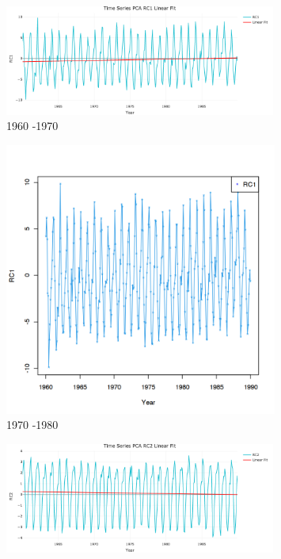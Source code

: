 \documentclass[12pt,a4paper]{article}
\begin{document}
\begin{figure}[t!ph]
         \begin{subfigure}[b]{0.3\textwidth}
                 \centering
                 \includegraphics[width=0.98\textwidth]{./gaphics/q002_d.png}
                 \caption{1960 -1970}
                 \label{fig2:coolcat}
         \end{subfigure}
         \begin{subfigure}[b]{0.3\textwidth}
                 \centering
                 \includegraphics[width=0.985\textwidth]{./gaphics/q002_e.png}
               \caption{1970 -1980}
                 \label{fig2:bossycat}
         \end{subfigure}%
         \begin{subfigure}[b]{0.3\textwidth}
                 \centering
                 \includegraphics[width=0.98\textwidth]{./gaphics/q002_f.png}

\end{subfigure}
\end{figure}
\end{document}
